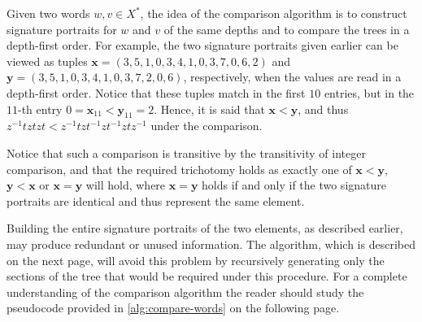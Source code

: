 Given two words $w,v \in X^\ast$, the idea of the comparison algorithm is to construct signature portraits for $w$ and $v$ of the same depths and to compare the trees in a depth-first order.
For example, the two signature portraits given earlier can be viewed as tuples $\mathbf{x} = (3,5,1,0,3,4,1,0,3,7,0,6,2)$ and $\mathbf{y} = (3,5,1,0,3,4,1,0,3,7,2,0,6)$, respectively, when the values are read in a depth-first order.
Notice that these tuples match in the first $10$ entries, but in the $11$-th entry $0 = \mathbf{x}_{11} < \mathbf{y}_{11} = 2$.
Hence, it is said that $\mathbf{x} < \mathbf{y}$, and thus $z^{-1}tztzt< z^{-1}tzt^{-1}zt^{-1}ztz^{-1}$ under the comparison.

Notice that such a comparison is transitive by the transitivity of integer comparison, and that the required trichotomy holds as exactly one of $\mathbf{x} < \mathbf{y}$,  $\mathbf{y}< \mathbf{x}$ or  $\mathbf{x} =  \mathbf{y}$ will hold, where $\mathbf{x} =  \mathbf{y}$ holds if and only if the two signature portraits are identical and thus represent the same element.

Building the entire signature portraits of the two elements, as described earlier, may produce redundant or unused information.
The algorithm, which is described on the next page, will avoid this problem by recursively generating only the sections of the tree that would be required under this procedure.
For a complete understanding of the comparison algorithm the reader should study the pseudocode provided in \cref{alg:compare-words} on the following page.


